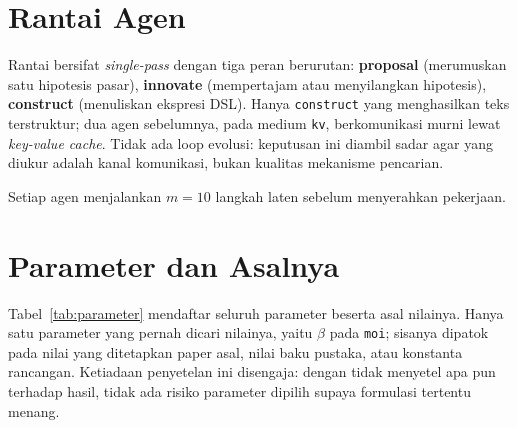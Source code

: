 \documentclass{laporanta1statugm}
\newcommand{\code}[1]{\texttt{#1}}
\begin{document}
\section{Rantai Agen}

Rantai bersifat \textit{single-pass} dengan tiga peran berurutan:
\textbf{proposal} (merumuskan satu hipotesis pasar), \textbf{innovate}
(mempertajam atau menyilangkan hipotesis), \textbf{construct} (menuliskan
ekspresi DSL). Hanya \code{construct} yang menghasilkan teks terstruktur; dua
agen sebelumnya, pada medium \code{kv}, berkomunikasi murni lewat
\textit{key-value cache}. Tidak ada loop evolusi: keputusan ini diambil sadar
agar yang diukur adalah kanal komunikasi, bukan kualitas mekanisme pencarian.

Setiap agen menjalankan $m = 10$ langkah laten sebelum menyerahkan pekerjaan.

\section{Parameter dan Asalnya}

Tabel~\ref{tab:parameter} mendaftar seluruh parameter beserta asal nilainya.
Hanya satu parameter yang pernah dicari nilainya, yaitu $\beta$ pada
\code{moi}; sisanya dipatok pada nilai yang ditetapkan paper asal, nilai baku
pustaka, atau konstanta rancangan. Ketiadaan penyetelan ini disengaja: dengan
tidak menyetel apa pun terhadap hasil, tidak ada risiko parameter dipilih
supaya formulasi tertentu menang.
\end{document}
